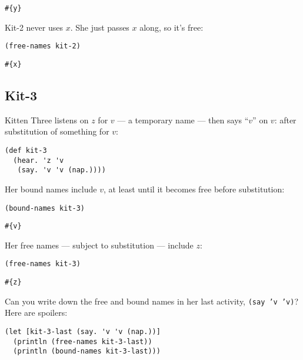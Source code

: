 \documentclass[10pt,oneside,x11names]{article}
\theoremstyle{definition}
\theoremstyle{warning}
\begin{document}
\begin{verbatim}
#{y}
\end{verbatim}


Kit-2 never uses \(x\). She just passes \(x\) along, so it's free:

\vskip 0.26cm
\begin{verbatim}
(free-names kit-2)
\end{verbatim}

\begin{verbatim}
#{x}
\end{verbatim}

\subsection{Kit-3}
\label{sec:orgb2ce47b}

Kitten Three listens on \(z\) for \(v\) --- a temporary name --- then
says ``\(v\)'' on \(v\): after substitution of something for \(v\):

\vskip 0.26cm
\begin{verbatim}
(def kit-3
  (hear. 'z 'v
   (say. 'v 'v (nap.))))
\end{verbatim}

Her bound names include \(v\), at least until it becomes free
before substitution:

\vskip 0.26cm
\begin{verbatim}
(bound-names kit-3)
\end{verbatim}

\begin{verbatim}
#{v}
\end{verbatim}


Her free names --- subject to substitution --- include \(z\):

\vskip 0.26cm
\begin{verbatim}
(free-names kit-3)
\end{verbatim}

\begin{verbatim}
#{z}
\end{verbatim}


Can you write down the free and bound names in her last activity,
\texttt{(say 'v 'v)}? Here are spoilers:

\vskip 0.26cm
\begin{verbatim}
(let [kit-3-last (say. 'v 'v (nap.))]
  (println (free-names kit-3-last))
  (println (bound-names kit-3-last)))
\end{verbatim}
\end{document}
